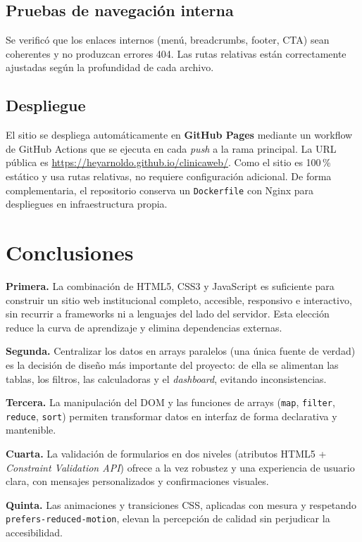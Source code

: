 \documentclass[11pt,a4paper]{article}
\begin{document}
\subsection{Pruebas de navegación interna}
Se verificó que los enlaces internos (menú, breadcrumbs, footer, CTA) sean coherentes y no produzcan errores 404. Las rutas relativas están correctamente ajustadas según la profundidad de cada archivo.

\subsection{Despliegue}
El sitio se despliega automáticamente en \textbf{GitHub Pages} mediante un workflow de GitHub Actions que se ejecuta en cada \emph{push} a la rama principal. La URL pública es \url{https://heyarnoldo.github.io/clinicaweb/}. Como el sitio es 100\,\% estático y usa rutas relativas, no requiere configuración adicional. De forma complementaria, el repositorio conserva un \texttt{Dockerfile} con Nginx para despliegues en infraestructura propia.

\section{Conclusiones}

\textbf{Primera.} La combinación de HTML5, CSS3 y JavaScript es suficiente para construir un sitio web institucional completo, accesible, responsivo e interactivo, sin recurrir a frameworks ni a lenguajes del lado del servidor. Esta elección reduce la curva de aprendizaje y elimina dependencias externas.

\textbf{Segunda.} Centralizar los datos en arrays paralelos (una única fuente de verdad) es la decisión de diseño más importante del proyecto: de ella se alimentan las tablas, los filtros, las calculadoras y el \emph{dashboard}, evitando inconsistencias.

\textbf{Tercera.} La manipulación del DOM y las funciones de arrays (\lstinline|map|, \lstinline|filter|, \lstinline|reduce|, \lstinline|sort|) permiten transformar datos en interfaz de forma declarativa y mantenible.

\textbf{Cuarta.} La validación de formularios en dos niveles (atributos HTML5 + \emph{Constraint Validation API}) ofrece a la vez robustez y una experiencia de usuario clara, con mensajes personalizados y confirmaciones visuales.

\textbf{Quinta.} Las animaciones y transiciones CSS, aplicadas con mesura y respetando \lstinline|prefers-reduced-motion|, elevan la percepción de calidad sin perjudicar la accesibilidad.
\end{document}
